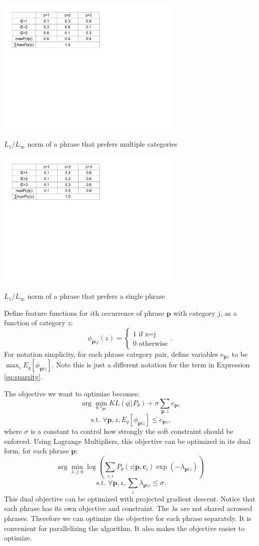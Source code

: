 \begin{table}[h]
  \label{tab:sparse}

  \centering
  \includegraphics[width=3.5in]{pr-clustering/sparse0}
  \caption{$L_1/L_{\infty}$ norm of a phrase
  that prefers multiple categories}
  \includegraphics[width=3.5in]{pr-clustering/sparse1}
  \caption{$L_1/L_{\infty}$ norm of a phrase
  that prefers a single phrase}
\end{table}

Define feature functions for $i$th occurrence of phrase $\textbf{p}$
with category $j$,
as a function of category $z$:
\[
\phi_{\textbf{p}ij}(z)=
\begin{cases}
1\text{ if z=j}\\
0\text{ otherwise}
\end{cases}.
\]
For notation simplicity, for
each phrase category pair, 
define variables 
$e_{\textbf{p}z}$ to be 
$\max_i E_q[\phi_{\textbf{p}iz}]$. Note this is just
a different notation for the term in
Expression \ref{eq:sparsity}.

The objective we want to optimize becomes:
\[
\arg\min_{q,c_{\textbf{p}z}} KL(q||P_{\theta}) + 
\sigma \sum_{\textbf{p},z}e_{\textbf{p}z}
\]
\[
\text{ s.t. }\forall \textbf{p},z,
E_q[\phi_{\textbf{p}iz}]\leq e_{\textbf{p}z},
\]
where $\sigma$ is a constant to control
how strongly the soft constraint should
be enforced.
Using Lagrange Multipliers, this objective can
be optimized in its dual form,
for each phrase $\textbf{p}$:
\[
\arg\min_{\lambda\geq 0} \log 
(\sum_{z,i} P_\theta(z|\textbf{p},\textbf{c}_i)
\exp (-\lambda_{\textbf{p}iz}))
\]
\[
\text{ s.t. } \forall \textbf{p},z,
\sum_i \lambda_{\textbf{p}iz}\leq \sigma.
\]
This dual objective can be optimized with projected gradient
descent. Notice that each phrase has its own objective and
constraint. The $\lambda$s are not shared acrossed
phrases. Therefore we can optimize the objective
for each phrase separately. It is convenient for parallelizing
the algorithm. It also makes the objective easier to optimize.

